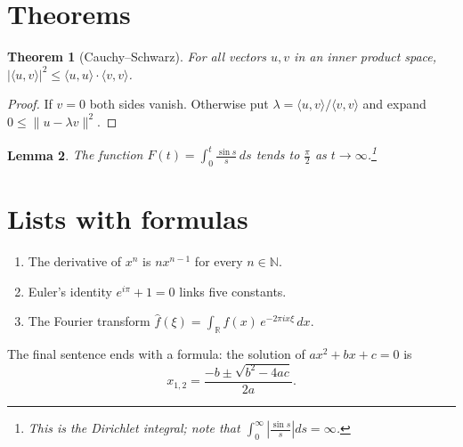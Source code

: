 \documentclass[11pt]{article}
\newtheorem{theorem}{Theorem}[section]
\newtheorem{lemma}[theorem]{Lemma}
\begin{document}
\section{Theorems}
\begin{theorem}[Cauchy--Schwarz]
For all vectors $u, v$ in an inner product space, $|\langle u, v\rangle|^2 \leq \langle u,u\rangle \cdot \langle v,v\rangle$.
\end{theorem}
\begin{proof}
If $v = 0$ both sides vanish. Otherwise put $\lambda = \langle u,v\rangle / \langle v,v\rangle$ and expand
$0 \leq \|u - \lambda v\|^2$.
\end{proof}
\begin{lemma}
The function $F(t) = \int_0^t \frac{\sin s}{s}\,ds$ tends to $\frac{\pi}{2}$ as $t \to \infty$.\footnote{This is the
Dirichlet integral; note that $\int_0^\infty \left|\frac{\sin s}{s}\right| ds = \infty$.}
\end{lemma}

\section{Lists with formulas}
\begin{enumerate}
  \item The derivative of $x^n$ is $n x^{n-1}$ for every $n \in \mathbb{N}$.
  \item Euler's identity $e^{i\pi} + 1 = 0$ links five constants.
  \item The Fourier transform $\hat{f}(\xi) = \int_{\mathbb{R}} f(x)\, e^{-2\pi i x \xi}\, dx$.
\end{enumerate}
The final sentence ends with a formula: the solution of $ax^2+bx+c=0$ is
\begin{equation}
  x_{1,2} = \frac{-b \pm \sqrt{b^2-4ac}}{2a}.
\end{equation}
\end{document}
